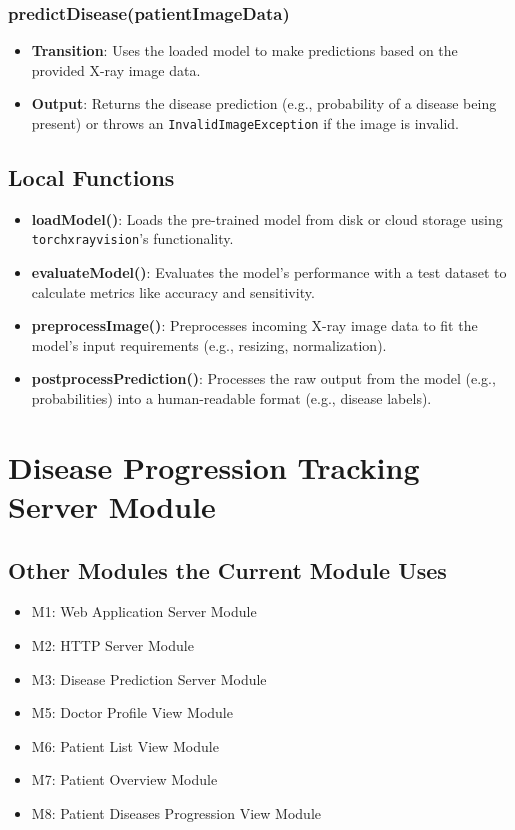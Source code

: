 \documentclass[12pt, titlepage]{article}
\begin{document}
\subsubsection{predictDisease(patientImageData)}
\begin{itemize}
    \item \textbf{Transition}: Uses the loaded model to make predictions based on the provided X-ray image data.
    \item \textbf{Output}: Returns the disease prediction (e.g., probability of a disease being present) or throws an \texttt{InvalidImageException} if the image is invalid.
\end{itemize}

\subsection{Local Functions}
\begin{itemize}
    \item \textbf{loadModel()}: Loads the pre-trained model from disk or cloud storage using \texttt{torchxrayvision}'s functionality.
    \item \textbf{evaluateModel()}: Evaluates the model’s performance with a test dataset to calculate metrics like accuracy and sensitivity.
    \item \textbf{preprocessImage()}: Preprocesses incoming X-ray image data to fit the model's input requirements (e.g., resizing, normalization).
    \item \textbf{postprocessPrediction()}: Processes the raw output from the model (e.g., probabilities) into a human-readable format (e.g., disease labels).
\end{itemize}

\section{Disease Progression Tracking Server Module}

\subsection{Other Modules the Current Module Uses}
\begin{itemize}
\item M1: Web Application Server Module
\item M2: HTTP Server Module
\item M3: Disease Prediction Server Module
\item M5: Doctor Profile View Module
\item M6: Patient List View Module
\item M7: Patient Overview Module
\item M8: Patient Diseases Progression View Module
\end{itemize}
\end{document}
